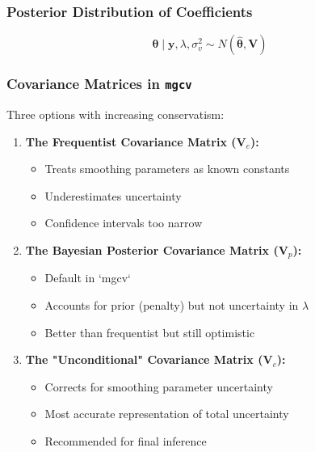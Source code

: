 \documentclass[12pt]{article}
\begin{document}
\subsubsection{Posterior Distribution of Coefficients}
\begin{equation*}
    \boldsymbol{\theta} \mid \mathbf{y}, \lambda, \sigma_v^2 \sim N(\hat{\boldsymbol{\theta}}, \mathbf{V})
\end{equation*}

\subsubsection{Covariance Matrices in \texttt{mgcv}}
Three options with increasing conservatism:
\begin{enumerate}
    \item \textbf{The Frequentist Covariance Matrix ($\mathbf{V}_e$):} 
    \begin{itemize}
        \item Treats smoothing parameters as known constants
        \item Underestimates uncertainty
        \item Confidence intervals too narrow
    \end{itemize}

    \item \textbf{The Bayesian Posterior Covariance Matrix ($\mathbf{V}_p$):} 
    \begin{itemize}
        \item Default in `mgcv`
        \item Accounts for prior (penalty) but not uncertainty in $\lambda$
        \item Better than frequentist but still optimistic
    \end{itemize}

    \item \textbf{The "Unconditional" Covariance Matrix ($\mathbf{V}_c$):} 
    \begin{itemize}
        \item Corrects for smoothing parameter uncertainty
        \item Most accurate representation of total uncertainty
        \item Recommended for final inference
    \end{itemize}
\end{enumerate}
\end{document}
